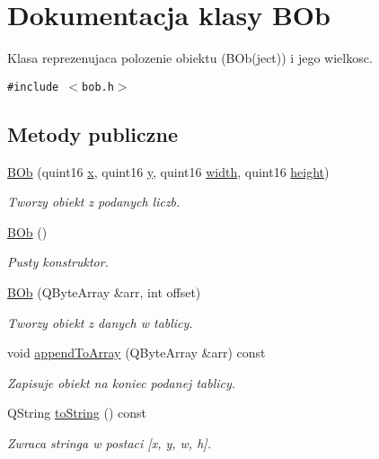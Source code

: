 \hypertarget{class_b_ob}{
\section{Dokumentacja klasy BOb}
\label{class_b_ob}
}
Klasa reprezenujaca polozenie obiektu (BOb(ject)) i jego wielkosc.  


{\tt \#include $<$bob.h$>$}

\subsection*{Metody publiczne}
\begin{CompactItemize}
\item 
\hypertarget{class_b_ob_cda4962a7ee72394a87ba34e09eb23f6}{
\hyperlink{class_b_ob_cda4962a7ee72394a87ba34e09eb23f6}{BOb} (quint16 \hyperlink{class_b_ob_5dcc6a3c2f4ffaf3d630187e853dd876}{x}, quint16 \hyperlink{class_b_ob_da96bf49e446d3f9a5ce02f36e44c9b4}{y}, quint16 \hyperlink{class_b_ob_3e1652784396111952cd16a77a666a2b}{width}, quint16 \hyperlink{class_b_ob_c406681bc6029dc6e41aa53791e9f210}{height})}
\label{class_b_ob_cda4962a7ee72394a87ba34e09eb23f6}

\begin{CompactList}\small\item\em Tworzy obiekt z podanych liczb. \item\end{CompactList}\item 
\hypertarget{class_b_ob_be1a4712878bfad0ccdbf9b2839c6a70}{
\hyperlink{class_b_ob_be1a4712878bfad0ccdbf9b2839c6a70}{BOb} ()}
\label{class_b_ob_be1a4712878bfad0ccdbf9b2839c6a70}

\begin{CompactList}\small\item\em Pusty konstruktor. \item\end{CompactList}\item 
\hyperlink{class_b_ob_b71739ff83cf58d15b42f26274c583d1}{BOb} (QByteArray \&arr, int offset)
\begin{CompactList}\small\item\em Tworzy obiekt z danych w tablicy. \item\end{CompactList}\item 
void \hyperlink{class_b_ob_11fbd7ab4c8dda600232b40b02a20cbe}{appendToArray} (QByteArray \&arr) const 
\begin{CompactList}\small\item\em Zapisuje obiekt na koniec podanej tablicy. \item\end{CompactList}\item 
\hypertarget{class_b_ob_17bbb520d60e0a98312b185f5e9bc928}{
QString \hyperlink{class_b_ob_17bbb520d60e0a98312b185f5e9bc928}{toString} () const }
\label{class_b_ob_17bbb520d60e0a98312b185f5e9bc928}

\begin{CompactList}\small\item\em Zwraca stringa w postaci \mbox{[}x, y, w, h\mbox{]}. \item\end{CompactList}\end{CompactItemize}

